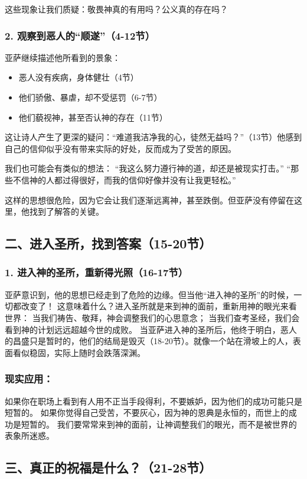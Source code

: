 \documentclass[a4paper, 12pt]{article}
\begin{document}
这些现象让我们质疑：敬畏神真的有用吗？公义真的存在吗？
\subsubsection*{2. 观察到恶人的“顺遂”（4-12节）}
亚萨继续描述他所看到的景象：
\begin{itemize}
    \item 恶人没有疾病，身体健壮（4节）

    \item 他们骄傲、暴虐，却不受惩罚（6-7节）

    \item 他们藐视神，甚至否认神的存在（11节）
\end{itemize}

这让诗人产生了更深的疑问：“难道我洁净我的心，徒然无益吗？”（13节）他感到自己的信仰似乎没有带来实际的好处，反而成为了受苦的原因。

我们也可能会有类似的想法：
“我这么努力遵行神的道，却还是被现实打击。”
“那些不信神的人都过得很好，而我的信仰好像并没有让我更轻松。”

这样的思想很危险，因为它会让我们逐渐远离神，甚至跌倒。但亚萨没有停留在这里，他找到了解答的关键。
\subsection*{二、进入圣所，找到答案（15-20节）}
\subsubsection*{1. 进入神的圣所，重新得光照（16-17节）}
亚萨意识到，他的思想已经走到了危险的边缘。但当他“进入神的圣所”的时候，一切都改变了！
这意味着什么？进入圣所就是来到神的面前，重新用神的眼光来看世界：
当我们祷告、敬拜，神会调整我们的心思意念；
当我们查考圣经，我们会看到神的计划远远超越今世的成败。
当亚萨进入神的圣所后，他终于明白，恶人的昌盛只是暂时的，他们的结局是毁灭（18-20节）。就像一个站在滑坡上的人，表面看似稳固，实际上随时会跌落深渊。
\subsubsection*{现实应用：}
如果你在职场上看到有人用不正当手段得利，不要嫉妒，因为他们的成功可能只是短暂的。
如果你觉得自己受苦，不要灰心，因为神的恩典是永恒的，而世上的成功是短暂的。
我们要常常来到神的面前，让神调整我们的眼光，而不是被世界的表象所迷惑。
\subsection*{三、真正的祝福是什么？（21-28节）}
\end{document}
